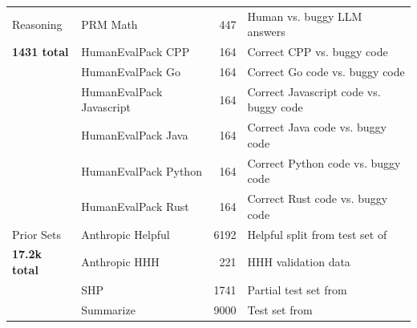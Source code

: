 \begin{table}[t]
{\begin{tabular}{llrp{7cm}}
\midrule
Reasoning  & PRM Math &  447 & Human vs. buggy LLM answers~\citep{lightman2023let} \\
\textbf{1431 total}           & HumanEvalPack CPP  &  164 & Correct CPP vs. buggy code~\citep{muennighoff2023octopack} \\
           & HumanEvalPack Go   &  164 & Correct Go code vs. buggy code \\
           & HumanEvalPack Javascript &  164 & Correct Javascript code vs. buggy code \\
           & HumanEvalPack Java & 164 & Correct Java code vs. buggy code \\
           & HumanEvalPack Python & 164 & Correct Python code vs. buggy code \\
           & HumanEvalPack Rust   & 164 & Correct Rust code vs. buggy code \\           
\midrule
\midrule
Prior Sets  & Anthropic Helpful &  6192 & Helpful split from test set of~\citet{bai2022training}\\
\textbf{17.2k total}           & Anthropic HHH  &  221 & HHH validation data~\citep{askell2021general} \\
           & SHP   &  1741 & Partial test set from~\citet{pmlr-v162-ethayarajh22a}\\
           & Summarize &  9000 & Test set from~\citet{stiennon2020learning} \\
\bottomrule
\end{tabular}
\label{table:dataset_char}
}
\end{table}
